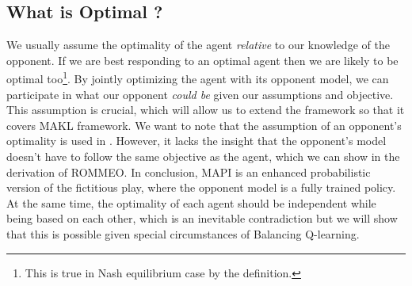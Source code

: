 \subsection{What is Optimal ?}
We usually assume the optimality of the agent \textit{relative} to our knowledge of the opponent. If we are best responding to an optimal agent then we are likely to be optimal too\footnote{This is true in Nash equilibrium case by the definition.}. By jointly optimizing the agent with its opponent model, we can participate in what our opponent \textit{could be} given our assumptions and objective. This assumption is crucial, which will allow us to extend the framework so that it covers MAKL framework. We want to note that the assumption of an opponent's optimality is used in \cite{tian2019regularized}. However, it lacks the insight that the opponent's model doesn't have to follow the same objective as the agent, which we can show in the derivation of ROMMEO. In conclusion, MAPI is an enhanced probabilistic version of the fictitious play, where the opponent model is a fully trained policy. At the same time, the optimality of each agent should be independent while being based on each other, which is an inevitable contradiction but we will show that this is possible given special circumstances of Balancing Q-learning. 


